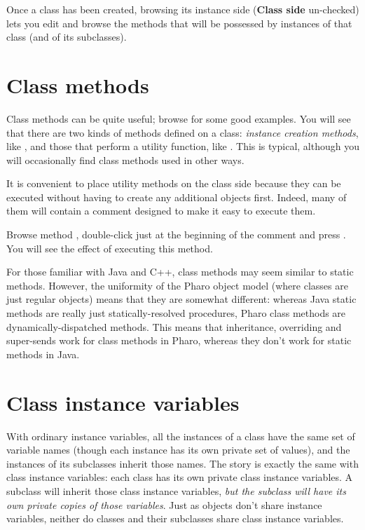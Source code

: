 \documentclass[10pt,twoside,english]{_support/latex/sbabook/sbabook}
\begin{document}
Once a class has been created, browsing its instance side (\textbf{Class side}
un-checked) lets you edit and browse the methods that will be possessed by
instances of that class (and of its subclasses).
\section{Class methods}
Class methods can be quite useful; browse  for some good
examples. You will see that there are two kinds of methods defined on a class:
\textit{instance creation methods}, like , and those that
perform a utility function, like . This is typical,
although you will occasionally find class methods used in other ways.

It is convenient to place utility methods on the class side because they can be
executed without having to create any additional objects first. Indeed, many of
them will contain a comment designed to make it easy to execute them.

Browse method , double-click just at the beginning of the
comment  and press . You will see the
effect of executing this method.

For those familiar with Java and C++, class methods may seem similar to static
methods. However, the uniformity of the Pharo object model (where classes are
just regular objects) means that they are somewhat different: whereas Java
static methods are really just statically-resolved procedures, Pharo class
methods are dynamically-dispatched methods. This means that inheritance,
overriding and super-sends work for class methods in Pharo, whereas they don't
work for static methods in Java.
\section{Class instance variables}
With ordinary instance variables, all the instances of a class have the same set
of variable names (though each instance has its own private set of values), and
the instances of its subclasses inherit those names. The story is exactly the
same with class instance variables: each class has its own private class
instance variables. A subclass will inherit those class instance variables,
\textit{but the subclass will have its own private copies of those variables}. Just
as objects don't share instance variables, neither do classes and their
subclasses share class instance variables.
\end{document}
